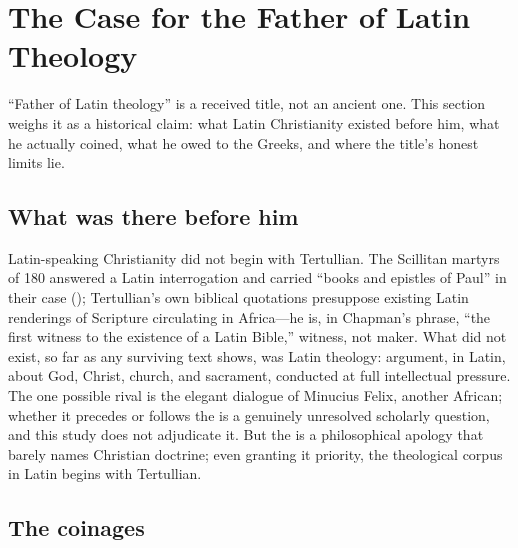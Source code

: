 \section{The Case for the Father of Latin Theology}

``Father of Latin theology'' is a received title, not an ancient one. This
section weighs it as a historical claim: what Latin Christianity existed
before him, what he actually coined, what he owed to the Greeks, and where the
title's honest limits lie.

\subsection{What was there before him}

Latin-speaking Christianity did not begin with Tertullian. The Scillitan
martyrs of 180 answered a Latin interrogation and carried ``books and epistles
of Paul'' in their case (); Tertullian's
own biblical quotations presuppose existing Latin renderings of Scripture
circulating in Africa---he is, in Chapman's phrase, ``the first witness to the
existence of a Latin Bible,'' witness, not maker. What did not exist, so far
as any surviving text shows, was Latin theology: argument, in Latin, about
God, Christ, church, and sacrament, conducted at full intellectual pressure.
The one possible rival is the elegant dialogue  of Minucius
Felix, another African; whether it precedes or follows the  is
a genuinely unresolved scholarly question, and this study does not adjudicate
it. But the  is a philosophical apology that barely names
Christian doctrine; even granting it priority, the theological corpus in
Latin begins with Tertullian.

\subsection{The coinages}

